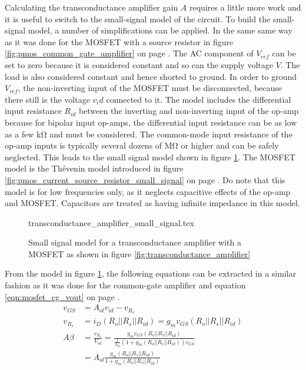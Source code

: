 \documentclass[12pt]{book}
\begin{document}
Calculating the transconductance amplifier gain $A$ requires a little more work and it is useful to switch to the small-signal model of the circuit. To build the small-signal model, a number of simplifications can be applied. In the same same way as it was done for the MOSFET with a source resistor in figure \ref{fig:pmos_common_gate_amplifier} on page \pageref{fig:pmos_common_gate_amplifier}. The AC component of $V_{ref}$ can be set to zero because it is considered constant and so can the supply voltage $V$. The load is also considered constant and hence shorted to ground. In order to ground $V_{ref}$, the non-inverting input of the MOSFET must be disconnected, because there still is the voltage $v_id$ connected to it. The model includes the differential input resistance $R_{id}$ between the inverting and non-inverting input of the op-amp because for bipolar input op-amps, the differential input resistance can be as low as a few \unit{\kilo\ohm} and must be considered. The common-mode input resistance of the op-amp inputs is typically several dozens of \unit{\mega \ohm} or higher and can be safely neglected. This leads to the small signal model shown in figure \ref{fig:transconductance_amplifier_small_signal}. The MOSFET model is the Thévenin model introduced in figure \ref{fig:pmos_current_source_resistor_small_signal} on page \pageref{fig:pmos_current_source_resistor_small_signal}. Do note that this model is for low frequencies only, as it neglects capacitive effects of the op-amp and MOSFET. Capacitors are treated as having infinite impedance in this model.

\begin{figure}[hb]
    \centering
        {transconductance_amplifier_small_signal.tex}
    \caption{Small signal model for a transconductance amplifier with a MOSFET as shown in figure \ref{fig:transconductance_amplifier}}
    \label{fig:transconductance_amplifier_small_signal}
\end{figure}

From the model in figure \ref{fig:transconductance_amplifier_small_signal}, the following equations can be extracted in a similar fashion as it was done for the common-gate amplifier and equation \ref{eqn:mosfet_cg_vout} on page \pageref{eqn:mosfet_cg_vout}.
\begin{align}
    v_{GS} &= A_{ol} v_{id} - v_{R_s}\\
    v_{R_s} &= i_D \left(R_o || R_s || R_{id}\right) = g_m v_{GS} \left(R_o || R_s || R_{id}\right)\\
    A\beta &= \frac{v_{R_s}}{V_{id}} = \frac{g_m v_{GS} \left(R_o || R_s || R_{id}\right)}{\frac{1}{A_{ol}} \left(1 + g_m \left(R_o || R_s || R_{id}\right)\right) v_{GS}} \nonumber\\
    &= A_{ol} \frac{g_m \left(R_o || R_s || R_{id}\right)}{1 + g_m \left(R_o || R_s || R_{id}\right)}
\end{align}
\end{document}
